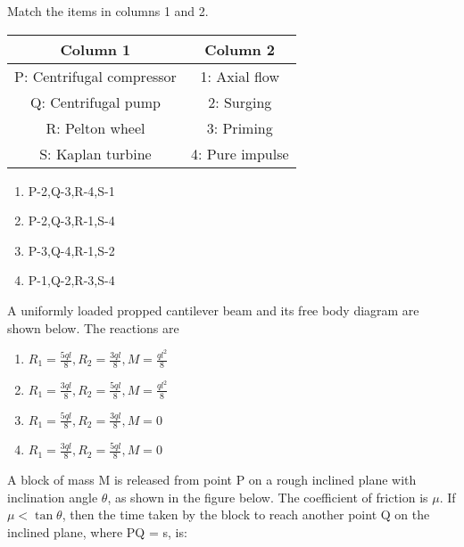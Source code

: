 \bigskip
\item Match the items in columns 1 and 2.\\    
\begin{tabular}{|c|c|}
    \hline
    Column 1 & Column 2 \\
    \hline
    P: Centrifugal compressor & 1: Axial flow \\
    Q: Centrifugal pump & 2: Surging \\
    R: Pelton wheel & 3: Priming \\
    S: Kaplan turbine & 4: Pure impulse \\
    \hline
\end{tabular}
\begin{enumerate}
    \item P-2,Q-3,R-4,S-1
    \item P-2,Q-3,R-1,S-4
    \item P-3,Q-4,R-1,S-2
    \item P-1,Q-2,R-3,S-4
\end{enumerate}
\bigskip
\item A uniformly loaded propped cantilever beam and its free body diagram are shown below. The reactions are


\begin{enumerate}
    \item  $ R_1 = \frac{5ql}{8}, R_2 = \frac{3ql}{8}, M = \frac{ql^2}{8} $
    \item  $ R_1 = \frac{3ql}{8}, R_2 = \frac{5ql}{8}, M = \frac{ql^2}{8}$
    \item  $R_1 = \frac{5ql}{8}, R_2 = \frac{3ql}{8}, M = 0$ 
    \item  $R_1 = \frac{3ql}{8}, R_2 = \frac{5ql}{8}, M = 0$ 
\end{enumerate}
\bigskip
\item A block of mass M is released from point P on a rough inclined plane with inclination angle $\theta$, as shown in the figure below. The coefficient of friction is $\mu$. If $\mu < \tan\theta$, then the time taken by the block to reach another point Q on the inclined plane, where PQ = s, is:

